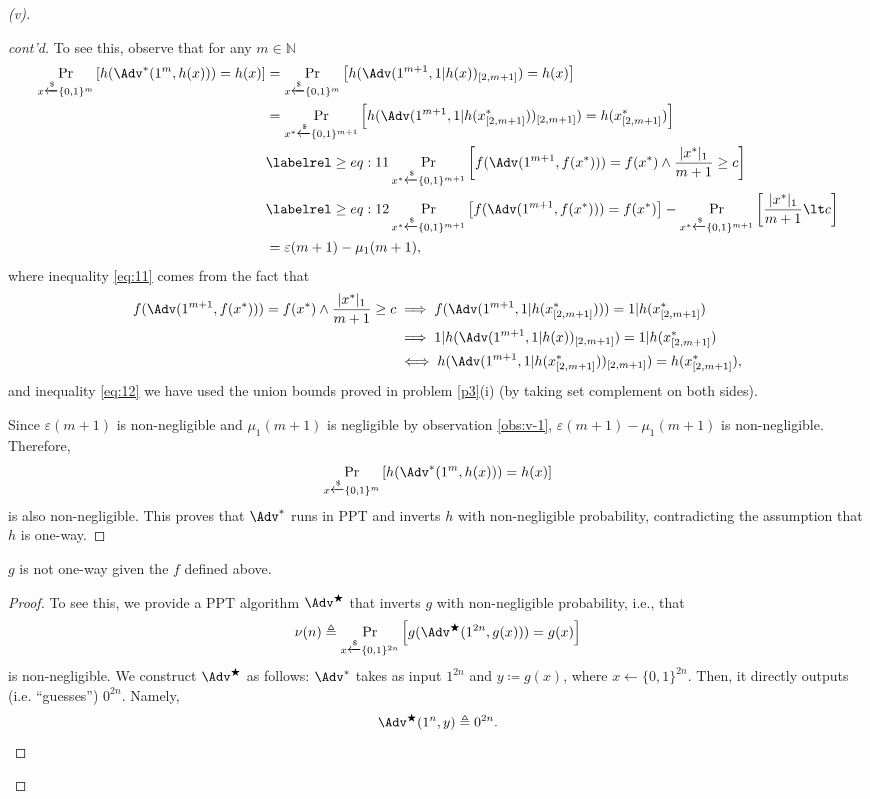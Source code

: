 \begin{proof}[(v)]
\begin{proof}[cont'd]
        To see this, observe that for any $m\in\mathbb{N}$
        \begin{align*}
            \Pr_{x\xleftarrow{\$}\{0,1\}^m}\left[h(\Adv^\ast(1^m, h(x))) = h(x)\right]
            &= \Pr_{x\xleftarrow{\$}\{0,1\}^m}\left[h(\Adv(1^{m+1}, 1|h(x))_{[2,m+1]}) = h(x)\right]\\
            &= \Pr_{x^\ast\xleftarrow{\$}\{0,1\}^{m+1}}\left[h(\Adv(1^{m+1}, 1|h(x^\ast_{[2,m+1]}))_{[2,m+1]}) = h(x^\ast_{[2,m+1]})\right]\\
            &\labelrel\ge{eq:11} \Pr_{x^\ast\xleftarrow{\$}\{0,1\}^{m+1}}\left[f(\Adv(1^{m+1}, f(x^\ast))) = f(x^\ast) \land \frac{|x^\ast|_1}{m+1}\ge c \right]\\
            &\labelrel\ge{eq:12} \Pr_{x^\ast\xleftarrow{\$}\{0,1\}^{m+1}}\left[f(\Adv(1^{m+1}, f(x^\ast))) = f(x^\ast)\right] - \Pr_{x^\ast\xleftarrow{\$}\{0,1\}^{m+1}}\left[ \frac{|x^\ast|_1}{m+1}\lt c \right]\\
            &= \varepsilon(m+1) - \mu_1(m+1),
        \end{align*}
        where inequality \eqref{eq:11} comes from the fact that
        \begin{align*}
        f(\Adv(1^{m+1}, f(x^\ast))) = f(x^\ast) \land \frac{|x^\ast|_1}{m+1}\ge c
        &\implies f(\Adv(1^{m+1}, 1|h(x^\ast_{[2,m+1]}))) = 1|h(x^\ast_{[2,m+1]})\\
        &\implies 1|h(\Adv(1^{m+1}, 1|h(x))_{[2, m+1]}) = 1|h(x^\ast_{[2,m+1]}) \\
        &\iff h(\Adv(1^{m+1}, 1|h(x^\ast_{[2,m+1]}))_{[2, m+1]}) = h(x^\ast_{[2,m+1]}),
        \end{align*}
        and inequality \eqref{eq:12} we have used the union bounds proved in problem \ref{p3}(i) (by taking set complement on both sides).
        
        Since $\varepsilon(m+1)$ is non-negligible and $\mu_1(m+1)$ is negligible by observation \ref{obs:v-1}, $\varepsilon(m+1) - \mu_1(m+1)$ is non-negligible. Therefore,
        \[
        \Pr_{x\xleftarrow{\$}\{0,1\}^m}\left[h(\Adv^\ast(1^m, h(x))) = h(x)\right]
        \]
        is also non-negligible. This proves that $\Adv^\ast$ runs in PPT and inverts $h$ with non-negligible probability, contradicting the assumption that $h$ is one-way.
    \end{proof}

    \newpage
    \begin{claim}
        \label{clm:v-2}
        $g$ is not one-way given the $f$ defined above.
    \end{claim}
    \begin{proof}
        To see this, we provide a PPT algorithm $\Adv^\bigstar$ that inverts $g$ with non-negligible probability, i.e., that
        \[
        \nu(n)\triangleq \Pr_{x\xleftarrow{\$}\{0,1\}^{2n}}\left[g(\Adv^\bigstar(1^{2n}, g(x))) = g(x)\right]
        \]
        is non-negligible. We construct $\Adv^\bigstar$ as follows: $\Adv^\ast$ takes as input $1^{2n}$ and $y\coloneq g(x)$, where $x\xleftarrow{}\{0,1\}^{2n}$. Then, it directly outputs (i.e. ``guesses'') $0^{2n}$. Namely,
        \[
        \Adv^\bigstar(1^{n}, y) \triangleq 0^{2n}.
        \]
        

\end{proof}
\end{proof}
